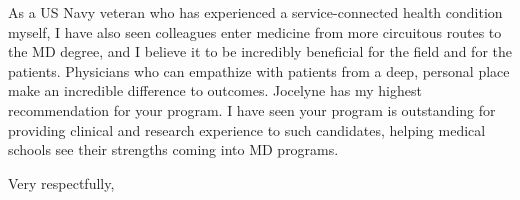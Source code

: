 \documentclass[10pt]{wrceletter}
\begin{document}
\begin{letter}{%
}
As a US Navy veteran who has experienced a service-connected health condition myself, I have also seen colleagues enter medicine from more circuitous routes to the MD degree, and I believe it to be incredibly beneficial for the field and for the patients. Physicians who can empathize with patients from a deep, personal place make an incredible difference to outcomes. Jocelyne has my highest recommendation for your program. I have seen your program is outstanding for providing clinical and research experience to such candidates, helping medical schools see their strengths coming into MD programs. 

\closing{Very respectfully,} %

\end{letter}
\end{document}
